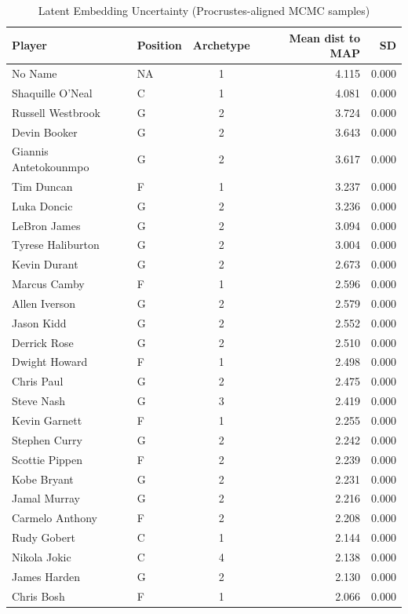 \begin{table}[t]
\caption*{
{\fontsize{20}{25}\selectfont  Latent Embedding Uncertainty (Procrustes-aligned MCMC samples)\fontsize{12}{15}\selectfont }
} 
\fontsize{12.0pt}{14.0pt}\selectfont
\begin{tabular*}{\linewidth}{@{\extracolsep{\fill}}llcrr}
\toprule
Player & Position & Archetype & Mean dist to MAP & SD \\ 
\midrule\addlinespace[2.5pt]
No Name & NA & 1 & 4.115 & 0.000 \\ 
Shaquille O'Neal & C & 1 & 4.081 & 0.000 \\ 
Russell Westbrook & G & 2 & 3.724 & 0.000 \\ 
Devin Booker & G & 2 & 3.643 & 0.000 \\ 
Giannis Antetokounmpo & G & 2 & 3.617 & 0.000 \\ 
Tim Duncan & F & 1 & 3.237 & 0.000 \\ 
Luka Doncic & G & 2 & 3.236 & 0.000 \\ 
LeBron James & G & 2 & 3.094 & 0.000 \\ 
Tyrese Haliburton & G & 2 & 3.004 & 0.000 \\ 
Kevin Durant & G & 2 & 2.673 & 0.000 \\ 
Marcus Camby & F & 1 & 2.596 & 0.000 \\ 
Allen Iverson & G & 2 & 2.579 & 0.000 \\ 
Jason Kidd & G & 2 & 2.552 & 0.000 \\ 
Derrick Rose & G & 2 & 2.510 & 0.000 \\ 
Dwight Howard & F & 1 & 2.498 & 0.000 \\ 
Chris Paul & G & 2 & 2.475 & 0.000 \\ 
Steve Nash & G & 3 & 2.419 & 0.000 \\ 
Kevin Garnett & F & 1 & 2.255 & 0.000 \\ 
Stephen Curry & G & 2 & 2.242 & 0.000 \\ 
Scottie Pippen & F & 2 & 2.239 & 0.000 \\ 
Kobe Bryant & G & 2 & 2.231 & 0.000 \\ 
Jamal Murray & G & 2 & 2.216 & 0.000 \\ 
Carmelo Anthony & F & 2 & 2.208 & 0.000 \\ 
Rudy Gobert & C & 1 & 2.144 & 0.000 \\ 
Nikola Jokic & C & 4 & 2.138 & 0.000 \\ 
James Harden & G & 2 & 2.130 & 0.000 \\ 
Chris Bosh & F & 1 & 2.066 & 0.000 \\ 

\end{tabular*}
\end{table}
